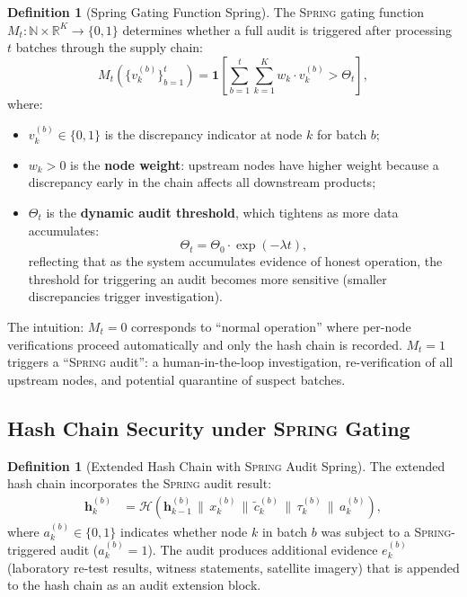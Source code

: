 \documentclass[11pt,a4paper]{article}
\theoremstyle{definition}
\newtheorem{definition}[theorem]{Definition}
\theoremstyle{remark}
\newcommand{\Spring}{\textsc{Spring}}
\newcommand{\R}{\mathbb{R}}
\newcommand{\N}{\mathbb{N}}
\newcommand{\ind}[1]{\mathbf{1}[#1]}
\newcommand{\hashFunc}{\mathcal{H}}
\newcommand{\hashChain}{\mathbf{h}}
\begin{document}
\begin{definition}[Spring Gating Function Spring]
\label{def:spring_gating}
The \Spring{} gating function $M_t: \N \times \R^K \to \{0, 1\}$ determines whether a full audit is triggered after processing $t$ batches through the supply chain:
\begin{equation}
    M_t(\{v_k^{(b)}\}_{b=1}^{t}) = \ind{\sum_{b=1}^{t} \sum_{k=1}^{K} w_k \cdot v_k^{(b)} > \Theta_t},
    \label{eq:M_t}
\end{equation}
where:
\begin{itemize}
    \item $v_k^{(b)} \in \{0, 1\}$ is the discrepancy indicator at node $k$ for batch $b$;
    \item $w_k > 0$ is the \textbf{node weight}: upstream nodes have higher weight because a discrepancy early in the chain affects all downstream products;
    \item $\Theta_t$ is the \textbf{dynamic audit threshold}, which tightens as more data accumulates:
    \begin{equation}
        \Theta_t = \Theta_0 \cdot \exp(-\lambda t),
        \label{eq:Theta_t}
    \end{equation}
    reflecting that as the system accumulates evidence of honest operation, the threshold for triggering an audit becomes more sensitive (smaller discrepancies trigger investigation).
\end{itemize}
\end{definition}

The intuition: $M_t = 0$ corresponds to ``normal operation'' where per-node verifications proceed automatically and only the hash chain is recorded. $M_t = 1$ triggers a ``\Spring{} audit'': a human-in-the-loop investigation, re-verification of all upstream nodes, and potential quarantine of suspect batches.

\subsection{Hash Chain Security under \Spring{} Gating}

\begin{definition}[Extended Hash Chain with \Spring{} Audit Spring]
\label{def:extended_hash}
The extended hash chain incorporates the \Spring{} audit result:
\begin{align}
    \hashChain_k^{(b)} &= \hashFunc(\hashChain_{k-1}^{(b)} \,\|\, x_k^{(b)} \,\|\, \tilde{c}_k^{(b)} \,\|\, \tau_k^{(b)} \,\|\, a_k^{(b)}), \label{eq:extended_hash}
\end{align}
where $a_k^{(b)} \in \{0, 1\}$ indicates whether node $k$ in batch $b$ was subject to a \Spring{}-triggered audit ($a_k^{(b)} = 1$). The audit produces additional evidence $e_k^{(b)}$ (laboratory re-test results, witness statements, satellite imagery) that is appended to the hash chain as an audit extension block.
\end{definition}
\end{document}
